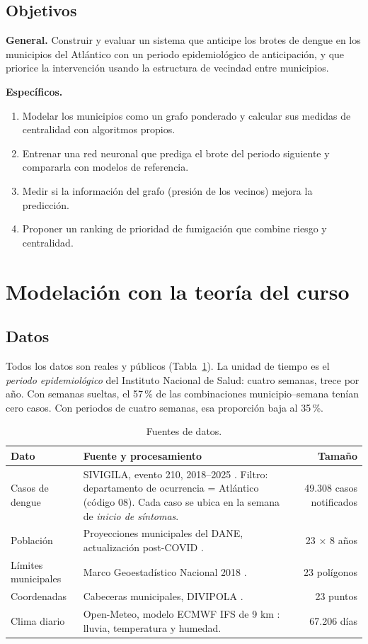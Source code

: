 \documentclass[11pt,letterpaper]{article}
\begin{document}
\subsection{Objetivos}
\textbf{General.} Construir y evaluar un sistema que anticipe los brotes de dengue en los municipios del Atlántico con un periodo epidemiológico de anticipación, y que priorice la intervención usando la estructura de vecindad entre municipios.

\noindent\textbf{Específicos.}
\begin{enumerate}[label=\arabic*.]
  \item Modelar los municipios como un grafo ponderado y calcular sus medidas de centralidad con algoritmos propios.
  \item Entrenar una red neuronal que prediga el brote del periodo siguiente y compararla con modelos de referencia.
  \item Medir si la información del grafo (presión de los vecinos) mejora la predicción.
  \item Proponer un ranking de prioridad de fumigación que combine riesgo y centralidad.
\end{enumerate}

\section{Modelación con la teoría del curso}

\subsection{Datos}
Todos los datos son reales y públicos (Tabla~\ref{tab:datos}). La unidad de tiempo es el \emph{periodo epidemiológico} del Instituto Nacional de Salud: cuatro semanas, trece por año. Con semanas sueltas, el 57\,\% de las combinaciones municipio–semana tenían cero casos. Con periodos de cuatro semanas, esa proporción baja al 35\,\%.

\begin{table}[H]
\centering\small
\caption{Fuentes de datos.}
\label{tab:datos}
\begin{tabularx}{\textwidth}{@{}lXr@{}}
\toprule
Dato & Fuente y procesamiento & Tamaño \\
\midrule
Casos de dengue & SIVIGILA, evento 210, 2018--2025 \citep{sivigila}. Filtro: departamento de ocurrencia = Atlántico (código 08). Cada caso se ubica en la semana de \emph{inicio de síntomas}. & 49.308 casos notificados \\
Población & Proyecciones municipales del DANE, actualización post-COVID \citep{dane_pob}. & 23 × 8 años \\
Límites municipales & Marco Geoestadístico Nacional 2018 \citep{dane_mgn}. & 23 polígonos \\
Coordenadas & Cabeceras municipales, DIVIPOLA \citep{dane_divipola}. & 23 puntos \\
Clima diario & Open-Meteo, modelo ECMWF IFS de 9 km \citep{openmeteo}: lluvia, temperatura y humedad. & 67.206 días \\
\bottomrule
\end{tabularx}
\end{table}
\end{document}
